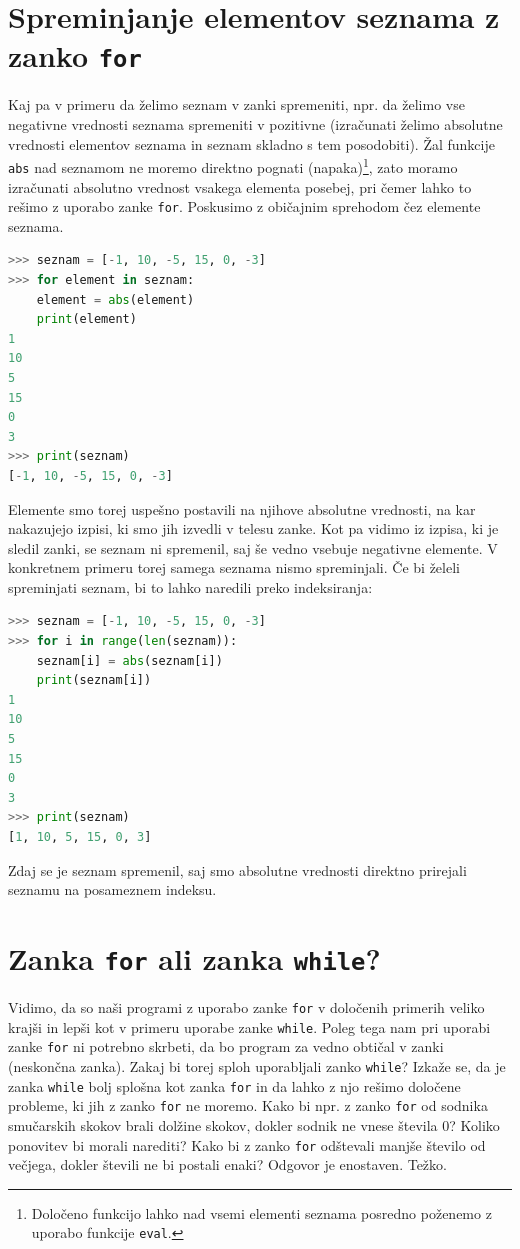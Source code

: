 \section{Spreminjanje elementov seznama z zanko \texttt{for}}
Kaj pa v primeru da želimo seznam v zanki spremeniti, npr. da želimo vse negativne vrednosti seznama spremeniti v pozitivne (izračunati želimo absolutne vrednosti elementov seznama in seznam skladno s tem posodobiti). Žal funkcije \texttt{abs} nad seznamom ne moremo direktno pognati (napaka)\footnote{Določeno funkcijo lahko nad vsemi elementi seznama posredno poženemo z uporabo funkcije \texttt{eval}.}, zato moramo izračunati absolutno vrednost vsakega elementa posebej, pri čemer lahko to rešimo z uporabo zanke \texttt{for}. Poskusimo z običajnim sprehodom čez elemente seznama.
\begin{lstlisting}[language=Python]
>>> seznam = [-1, 10, -5, 15, 0, -3]
>>> for element in seznam:
	element = abs(element)
	print(element)
1
10
5
15
0
3
>>> print(seznam)
[-1, 10, -5, 15, 0, -3]
\end{lstlisting}
Elemente smo torej uspešno postavili na njihove absolutne vrednosti, na kar nakazujejo izpisi, ki smo jih izvedli v telesu zanke. Kot pa vidimo iz izpisa, ki je sledil zanki, se seznam ni spremenil, saj še vedno vsebuje negativne elemente. V konkretnem primeru torej samega seznama nismo spreminjali. Če bi želeli spreminjati seznam, bi to lahko naredili preko indeksiranja:
\begin{lstlisting}[language=Python]
>>> seznam = [-1, 10, -5, 15, 0, -3]
>>> for i in range(len(seznam)):
	seznam[i] = abs(seznam[i])
	print(seznam[i])
1
10
5
15
0
3
>>> print(seznam)
[1, 10, 5, 15, 0, 3]
\end{lstlisting}
Zdaj se je seznam spremenil, saj smo absolutne vrednosti direktno prirejali seznamu na posameznem indeksu.

\section{Zanka \texttt{for} ali zanka \texttt{while}?}
Vidimo, da so naši programi z uporabo zanke \texttt{for} v določenih primerih veliko krajši in lepši kot v primeru uporabe zanke \texttt{while}. Poleg tega nam pri uporabi zanke \texttt{for} ni potrebno skrbeti, da bo program za vedno obtičal v zanki (neskončna zanka). Zakaj bi torej sploh uporabljali zanko \texttt{while}? Izkaže se, da je zanka \texttt{while} bolj splošna kot zanka \texttt{for} in da lahko z njo rešimo določene probleme, ki jih z zanko \texttt{for} ne moremo. Kako bi npr. z zanko \texttt{for} od sodnika smučarskih skokov brali dolžine skokov, dokler sodnik ne vnese števila 0? Koliko ponovitev bi morali narediti? Kako bi z zanko \texttt{for} odštevali manjše število od večjega, dokler števili ne bi postali enaki? Odgovor je enostaven. Težko.

